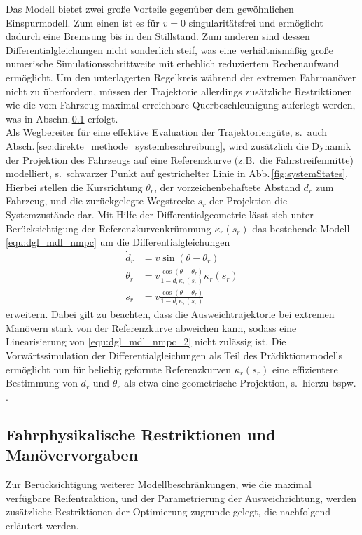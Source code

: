 Das Modell bietet zwei große Vorteile gegenüber dem gewöhnlichen Einspurmodell. Zum einen ist es für $v=0$ singularitätsfrei und ermöglicht dadurch eine Bremsung bis in den Stillstand. Zum anderen sind dessen Differentialgleichungen nicht sonderlich steif, was eine verhältnismäßig große numerische Simulationsschrittweite mit erheblich reduziertem Rechenaufwand ermöglicht. Um den unterlagerten Regelkreis während der extremen Fahrmanöver nicht zu überfordern, müssen der Trajektorie allerdings zusätzliche Restriktionen wie die vom Fahrzeug maximal erreichbare Querbeschleunigung auferlegt werden, was in Abschn.\,\ref{sec:constraints} erfolgt. \\
%
Als Wegbereiter für eine effektive Evaluation der Trajektoriengüte, s.\ auch Absch.\,\ref{sec:direkte_methode_systembeschreibung}, wird zusätzlich die Dynamik der Projektion des Fahrzeugs auf eine Referenzkurve (z.B.\ die Fahrstreifenmitte) modelliert, s.\ schwarzer Punkt auf gestrichelter Linie in Abb.\,\ref{fig:systemStates}. Hierbei stellen die Kursrichtung $\theta_r$, der vorzeichenbehaftete Abstand $d_r$ zum Fahrzeug, und die zurückgelegte Wegstrecke $s_r$ der Projektion die Systemzustände dar. Mit Hilfe der Differentialgeometrie \cite{morin2008hrc} lässt sich unter Berücksichtigung der Referenzkurvenkrümmung $\kappa_r(s_r)$ das bestehende Modell  \eqref{equ:dgl_mdl_nmpc} um die Differentialgleichungen
\begin{subequations} \label{equ:dgl_mdl_nmpc_2}
\begin{align}
\label{equ:d_r_dot}
\dot d_r &= v \sin(\theta - \theta_r) \\
\dot \theta_r &= v \frac{\cos(\theta - \theta_r)}{1-d_r \kappa_r(s_r)}\kappa_r(s_r) \\
\label{equ:s_r_dot}
\dot s_r &= v \frac{\cos(\theta - \theta_r)}{1-d_r \kappa_r(s_r)}
\end{align}
\end{subequations}
erweitern. Dabei gilt zu beachten, dass die Ausweichtrajektorie bei extremen Manövern stark von der Referenzkurve abweichen kann, sodass eine Linearisierung von \eqref{equ:dgl_mdl_nmpc_2} nicht zulässig ist. Die Vorwärtssimulation der Differentialgleichungen als Teil des Prädiktionsmodells ermöglicht nun für beliebig geformte Referenzkurven $\kappa_r(s_r)$ eine effizientere Bestimmung von $d_r$ und $\theta_r$ als etwa eine geometrische Projektion, s.\ hierzu bspw. \cite{irle2009zwei}.


\subsection{Fahrphysikalische Restriktionen und Manövervorgaben}\label{sec:constraints}
Zur Berücksichtigung weiterer Modellbeschränkungen, wie die maximal verfügbare Reifentraktion, und der Parametrierung der Ausweichrichtung, werden zusätzliche Restriktionen der Optimierung zugrunde gelegt, die nachfolgend erläutert werden.

